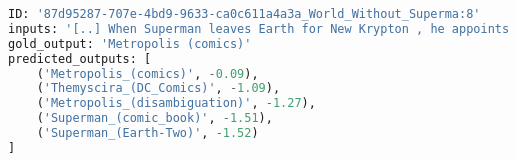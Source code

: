 \documentclass{article} \usepackage{main,times}
\makeatletter
\def\genre{\textsc{GENRE}\@\xspace}
\makeatother
\begin{document}
\begin{figure*}[!ht]
\centering
\begin{lstlisting}[language=Python,firstnumber=1]
ID: '87d95287-707e-4bd9-9633-ca0c611a4a3a_World_Without_Superma:8'
inputs: '[..] When Superman leaves Earth for New Krypton , he appoints , newly freed from the Phantom Zone , to take his place as guardian of [START_ENT] Metropolis [END_ENT] .  Mon-El assumes the secret identity of Johnathan Kent as a tribute to Clark \'s adoptive father , posing as Clark \'s cousin . [..]'
gold_output: 'Metropolis (comics)'
predicted_outputs: [
    ('Metropolis_(comics)', -0.09),
    ('Themyscira_(DC_Comics)', -1.09),
    ('Metropolis_(disambiguation)', -1.27),
    ('Superman_(comic_book)', -1.51),
    ('Superman_(Earth-Two)', -1.52)
]
\end{lstlisting}
\caption{Example of a \genre prediction for named entity disambiguation on KILT WNED. The input is plain text where a mention is flagged with two special start and end tokens \texttt{[START\_ENT]} and \texttt{[END\_ENT]}. The output is a ranked list of entity (where we report the log-likelihood as well).}
\label{fig:example_ned}
\end{figure*} 
\end{document}
